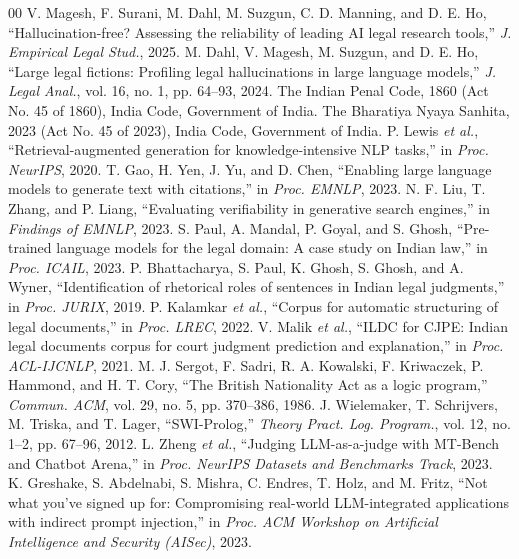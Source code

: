 \documentclass[conference]{IEEEtran}
\begin{document}
\begin{thebibliography}{00}
 V. Magesh, F. Surani, M. Dahl, M. Suzgun, C. D. Manning, and D. E. Ho, ``Hallucination-free? Assessing the reliability of leading AI legal research tools,'' \textit{J. Empirical Legal Stud.}, 2025.
 M. Dahl, V. Magesh, M. Suzgun, and D. E. Ho, ``Large legal fictions: Profiling legal hallucinations in large language models,'' \textit{J. Legal Anal.}, vol. 16, no. 1, pp. 64--93, 2024.
 The Indian Penal Code, 1860 (Act No. 45 of 1860), India Code, Government of India.
 The Bharatiya Nyaya Sanhita, 2023 (Act No. 45 of 2023), India Code, Government of India.
 P. Lewis \textit{et al.}, ``Retrieval-augmented generation for knowledge-intensive NLP tasks,'' in \textit{Proc. NeurIPS}, 2020.
 T. Gao, H. Yen, J. Yu, and D. Chen, ``Enabling large language models to generate text with citations,'' in \textit{Proc. EMNLP}, 2023.
 N. F. Liu, T. Zhang, and P. Liang, ``Evaluating verifiability in generative search engines,'' in \textit{Findings of EMNLP}, 2023.
 S. Paul, A. Mandal, P. Goyal, and S. Ghosh, ``Pre-trained language models for the legal domain: A case study on Indian law,'' in \textit{Proc. ICAIL}, 2023.
 P. Bhattacharya, S. Paul, K. Ghosh, S. Ghosh, and A. Wyner, ``Identification of rhetorical roles of sentences in Indian legal judgments,'' in \textit{Proc. JURIX}, 2019.
 P. Kalamkar \textit{et al.}, ``Corpus for automatic structuring of legal documents,'' in \textit{Proc. LREC}, 2022.
 V. Malik \textit{et al.}, ``ILDC for CJPE: Indian legal documents corpus for court judgment prediction and explanation,'' in \textit{Proc. ACL-IJCNLP}, 2021.
 M. J. Sergot, F. Sadri, R. A. Kowalski, F. Kriwaczek, P. Hammond, and H. T. Cory, ``The British Nationality Act as a logic program,'' \textit{Commun. ACM}, vol. 29, no. 5, pp. 370--386, 1986.
 J. Wielemaker, T. Schrijvers, M. Triska, and T. Lager, ``SWI-Prolog,'' \textit{Theory Pract. Log. Program.}, vol. 12, no. 1--2, pp. 67--96, 2012.
 L. Zheng \textit{et al.}, ``Judging LLM-as-a-judge with MT-Bench and Chatbot Arena,'' in \textit{Proc. NeurIPS Datasets and Benchmarks Track}, 2023.
 K. Greshake, S. Abdelnabi, S. Mishra, C. Endres, T. Holz, and M. Fritz, ``Not what you've signed up for: Compromising real-world LLM-integrated applications with indirect prompt injection,'' in \textit{Proc. ACM Workshop on Artificial Intelligence and Security (AISec)}, 2023.

\end{thebibliography}
\end{document}

